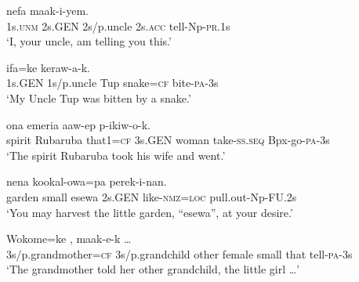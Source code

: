 \ea%
\label{ex:x835}
\gll {}    nefa  maak-i-yem. \\
  1s.\textsc{unm}  2s.GEN  2s/p.uncle  2s.\textsc{acc}  tell-Np-\textsc{pr}.1s    \\
\glt`I, your uncle, am telling you this.'
\z





\ea%
\label{ex:x836}
\gll {}    ifa=ke  keraw-a-k. \\
  1s.GEN  1s/p.uncle  Tup  snake=\textsc{cf}  bite-\textsc{pa}-3s    \\
\glt`My Uncle Tup was bitten by a snake.'
\z





\ea%
\label{ex:x837}
\gll {}     ona  emeria  aaw-ep  p-ikiw-o-k.\\
    spirit  Rubaruba  that1=\textsc{cf}  3s.GEN  woman  take-\textsc{ss}.\textsc{seq}  Bpx-go-\textsc{pa}-3s  \\
\glt`The spirit Rubaruba took his wife and went.'
\z









\ea%
\label{ex:x838}
\gll {}     nena  kookal-owa=pa  perek-i-nan.\\
garden  small  esewa  2s.GEN  like-\textsc{nmz}=\textsc{loc}   pull.out-Np-FU.2s     \\
\glt`You may harvest the little garden, ``esewa'', at your desire.'
\z









\ea%
\label{ex:x839}
\gll Wokome=ke   ,      maak-e-k  {\dots}\\
    3s/p.grandmother=\textsc{cf}  3s/p.grandchild  other  female  small  that  tell-\textsc{pa}-3s  \\
\glt`The grandmother told her other grandchild, the little girl {\dots}'
\z








